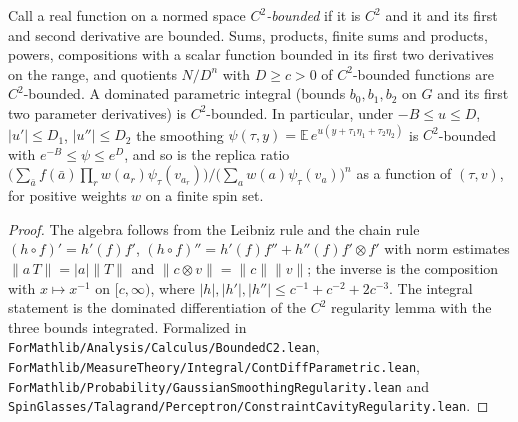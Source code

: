 \begin{lemma}\label{lem:sg-tal:boundedc2}
  \leanok
Call a real function on a normed space \emph{$C^2$-bounded} if it is $C^2$ and it and its first and second derivative are bounded. Sums, products, finite sums and products, powers, compositions with a scalar function bounded in its first two derivatives on the range, and quotients $N/D^n$ with $D\ge c>0$ of $C^2$-bounded functions are $C^2$-bounded. A dominated parametric integral (bounds $b_0,b_1,b_2$ on $G$ and its first two parameter derivatives) is $C^2$-bounded. In particular, under $-B\le u\le D$, $|u'|\le D_1$, $|u''|\le D_2$ the smoothing $\psi(\tau,y)=\mathbb E\,e^{u(y+\tau_1\eta_1+\tau_2\eta_2)}$ is $C^2$-bounded with $e^{-B}\le\psi\le e^D$, and so is the replica ratio $\bigl(\sum_{\bar a}f(\bar a)\prod_{r}w(a_r)\psi_\tau(v_{a_r})\bigr)\big/\bigl(\sum_a w(a)\psi_\tau(v_a)\bigr)^{n}$ as a function of $(\tau,v)$, for positive weights $w$ on a finite spin set.
\end{lemma}
\begin{proof}
  \leanok
The algebra follows from the Leibniz rule and the chain rule $(h\circ f)'=h'(f)f'$, $(h\circ f)''=h'(f)f''+h''(f)f'\otimes f'$ with norm estimates $\|a\,T\|=|a|\|T\|$ and $\|c\otimes v\|=\|c\|\|v\|$; the inverse is the composition with $x\mapsto x^{-1}$ on $[c,\infty)$, where $|h|,|h'|,|h''|\le c^{-1}+c^{-2}+2c^{-3}$. The integral statement is the dominated differentiation of the $C^2$ regularity lemma with the three bounds integrated.
Formalized in \texttt{ForMathlib/Analysis/Calculus/BoundedC2.lean}, \texttt{ForMathlib/MeasureTheory/Integral/ContDiffParametric.lean}, \texttt{ForMathlib/Probability/GaussianSmoothingRegularity.lean} and \texttt{SpinGlasses/Talagrand/Perceptron/ConstraintCavityRegularity.lean}.
\end{proof}


